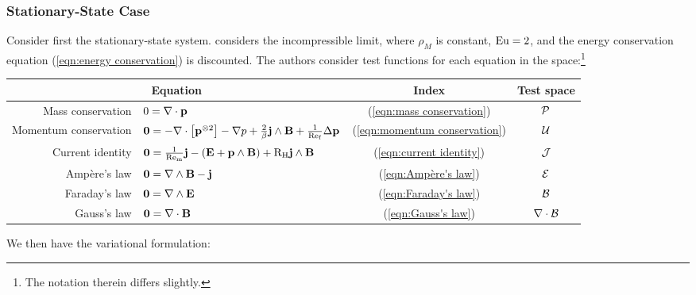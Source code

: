 \subsubsection*{Stationary-State Case}
    Consider first the stationary-state system. \cite{LHF22} considers the incompressible limit, where $\rho_{M}$ is constant, $\mathrm{Eu}  =  2$, and the energy conservation equation (\ref{eqn:energy conservation}) is discounted. The authors consider test functions for each equation in the space:\footnote{The notation therein differs slightly.}
    \begin{center}\begin{tabular}{ r l c | c }
        \multicolumn{2}{c}{Equation}  &  Index  &  Test space  \\
        \hline\hline
        Mass conservation  &  $0  =  \nabla\cdot\mathbf{p}$  &  (\ref{eqn:mass conservation})  &  $\mathcal{P}$  \\
        Momentum conservation  &  $\mathbf{0} 
         =  - \nabla\cdot\left[\mathbf{p}^{\otimes 2}\right] - \nabla p + \frac{2}{\beta}\mathbf{j}\wedge\mathbf{B} + \frac{1}{\mathrm{Re}_{\mathrm{f}}}\Delta\mathbf{p}$  &  (\ref{eqn:momentum conservation})  &  $\mathcal{U}$  \\
        \hline
        Current identity  &  $\mathbf{0}  =  \frac{1}{\mathrm{Re}_{\mathrm{m}}}\mathbf{j} - (\mathbf{E} + \mathbf{p}\wedge\mathbf{B}) + \mathrm{R}_{\mathrm{H}}\mathbf{j}\wedge\mathbf{B}$  &  (\ref{eqn:current identity})  &  $\mathcal{J}$  \\
        \hline
        Ampère's law  &  $\mathbf{0}  =  \nabla\wedge\mathbf{B} - \mathbf{j}$  &  (\ref{eqn:Ampère's law})  &  $\mathcal{E}$  \\
        Faraday's law  &  $\mathbf{0}  =  \nabla\wedge\mathbf{E}$  &  (\ref{eqn:Faraday's law})  &  $\mathcal{B}$  \\
        Gauss's law  &  $\mathbf{0}  =  \nabla\cdot\mathbf{B}$  &  (\ref{eqn:Gauss's law})  &  $\nabla\cdot\mathcal{B}$  \\
    \end{tabular}\end{center}
    We then have the variational formulation: 
